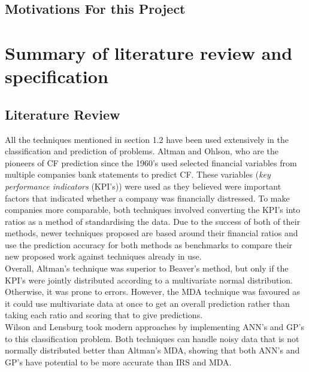 \documentclass[11pt]{article}
\begin{document}
\subsection{Motivations For this Project}
\newpage
\section{Summary of literature review and specification}\label{sec:spec}
\subsection{Literature Review}
All the techniques mentioned in section 1.2 have been used extensively in the classification and prediction of problems. Altman and Ohlson, who are the pioneers of CF prediction since the 1960's used selected financial variables from multiple companies bank statements to predict CF. These variables (\textit{key performance indicators} (KPI's)) were used as they believed were important factors that indicated whether a company was financially distressed. To make companies more comparable, both techniques involved converting the KPI's into ratios as a method of standardising the data. Due to the success of both of their methods, newer techniques proposed are based around their financial ratios and use the prediction accuracy for both methods as benchmarks to compare their new proposed work against techniques already in use. \\

Overall, Altman's technique was superior to Beaver's method, but only if the KPI's were jointly distributed according to a multivariate normal distribution. Otherwise, it was prone to errors. However, the MDA technique was favoured as it could use multivariate data at once to get an overall prediction rather than taking each ratio and scoring that to give predictions. \\
Wilson and Lensburg took modern approaches by implementing ANN's and GP's to this classification problem. Both techniques can handle noisy data that is not normally distributed better than Altman's MDA, showing that both ANN's and GP's have potential to be more accurate than IRS and MDA. 
\end{document}
